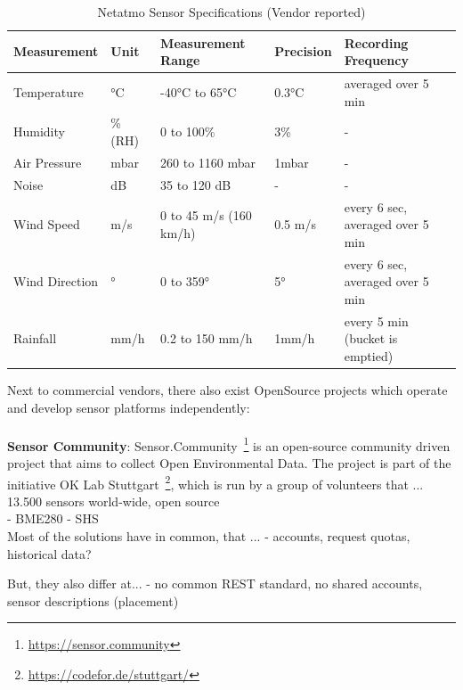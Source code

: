 \begin{table}[]
\begin{tabular}{@{}lllll@{}}
\toprule
Measurement    & Unit    & Measurement Range      & Precision  & Recording Frequency              \\ \midrule
Temperature    & °C      & -40°C to 65°C          & 0.3°C   & averaged over 5 min              \\
Humidity       & \% (RH) & 0 to 100\%             & 3\%     & -                                \\
Air Pressure   & mbar    & 260 to 1160 mbar       & 1mbar   & -                                \\
Noise          & dB      & 35 to 120 dB           & -       & -                                \\
Wind Speed     & m/s     & 0 to 45 m/s (160 km/h) & 0.5 m/s & every 6 sec, averaged over 5 min \\
Wind Direction & °       & 0 to 359°              & 5°      & every 6 sec, averaged over 5 min \\
Rainfall       & mm/h    & 0.2 to 150 mm/h        & 1mm/h   & every 5 min (bucket is emptied)  \\ \bottomrule
\end{tabular}
\caption{Netatmo Sensor Specifications (Vendor reported)}
\label{tab: netatmo sensor specs}
\end{table}

Next to commercial vendors, there also exist OpenSource projects which operate and develop sensor platforms independently:\\
\\
\textbf{Sensor Community}: Sensor.Community~\footnote{\url{https://sensor.community}} is an open-source community driven project that aims to collect Open Environmental Data. The project is part of the initiative OK Lab Stuttgart~\footnote{\url{https://codefor.de/stuttgart/}}, which is run by a group of volunteers that ...
13.500 sensors world-wide, open source\\
- BME280
- SHS 
\\
Most of the solutions have in common, that ...
- accounts, request quotas, historical data?

But, they also differ at...
- no common REST standard, no shared accounts, sensor descriptions (placement)

